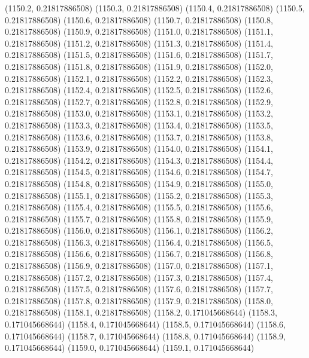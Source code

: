 {					(1150.2, 0.21817886508)
					(1150.3, 0.21817886508)
					(1150.4, 0.21817886508)
					(1150.5, 0.21817886508)
					(1150.6, 0.21817886508)
					(1150.7, 0.21817886508)
					(1150.8, 0.21817886508)
					(1150.9, 0.21817886508)
					(1151.0, 0.21817886508)
					(1151.1, 0.21817886508)
					(1151.2, 0.21817886508)
					(1151.3, 0.21817886508)
					(1151.4, 0.21817886508)
					(1151.5, 0.21817886508)
					(1151.6, 0.21817886508)
					(1151.7, 0.21817886508)
					(1151.8, 0.21817886508)
					(1151.9, 0.21817886508)
					(1152.0, 0.21817886508)
					(1152.1, 0.21817886508)
					(1152.2, 0.21817886508)
					(1152.3, 0.21817886508)
					(1152.4, 0.21817886508)
					(1152.5, 0.21817886508)
					(1152.6, 0.21817886508)
					(1152.7, 0.21817886508)
					(1152.8, 0.21817886508)
					(1152.9, 0.21817886508)
					(1153.0, 0.21817886508)
					(1153.1, 0.21817886508)
					(1153.2, 0.21817886508)
					(1153.3, 0.21817886508)
					(1153.4, 0.21817886508)
					(1153.5, 0.21817886508)
					(1153.6, 0.21817886508)
					(1153.7, 0.21817886508)
					(1153.8, 0.21817886508)
					(1153.9, 0.21817886508)
					(1154.0, 0.21817886508)
					(1154.1, 0.21817886508)
					(1154.2, 0.21817886508)
					(1154.3, 0.21817886508)
					(1154.4, 0.21817886508)
					(1154.5, 0.21817886508)
					(1154.6, 0.21817886508)
					(1154.7, 0.21817886508)
					(1154.8, 0.21817886508)
					(1154.9, 0.21817886508)
					(1155.0, 0.21817886508)
					(1155.1, 0.21817886508)
					(1155.2, 0.21817886508)
					(1155.3, 0.21817886508)
					(1155.4, 0.21817886508)
					(1155.5, 0.21817886508)
					(1155.6, 0.21817886508)
					(1155.7, 0.21817886508)
					(1155.8, 0.21817886508)
					(1155.9, 0.21817886508)
					(1156.0, 0.21817886508)
					(1156.1, 0.21817886508)
					(1156.2, 0.21817886508)
					(1156.3, 0.21817886508)
					(1156.4, 0.21817886508)
					(1156.5, 0.21817886508)
					(1156.6, 0.21817886508)
					(1156.7, 0.21817886508)
					(1156.8, 0.21817886508)
					(1156.9, 0.21817886508)
					(1157.0, 0.21817886508)
					(1157.1, 0.21817886508)
					(1157.2, 0.21817886508)
					(1157.3, 0.21817886508)
					(1157.4, 0.21817886508)
					(1157.5, 0.21817886508)
					(1157.6, 0.21817886508)
					(1157.7, 0.21817886508)
					(1157.8, 0.21817886508)
					(1157.9, 0.21817886508)
					(1158.0, 0.21817886508)
					(1158.1, 0.21817886508)
					(1158.2, 0.171045668644)
					(1158.3, 0.171045668644)
					(1158.4, 0.171045668644)
					(1158.5, 0.171045668644)
					(1158.6, 0.171045668644)
					(1158.7, 0.171045668644)
					(1158.8, 0.171045668644)
					(1158.9, 0.171045668644)
					(1159.0, 0.171045668644)
					(1159.1, 0.171045668644)
}
